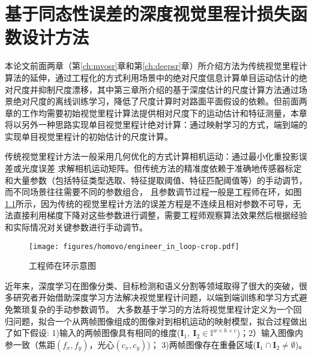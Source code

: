 \chapter{基于同态性误差的深度视觉里程计损失函数设计方法}
\label{ch:homovo}
本论文前面两章（第\ref{ch:mvosr}章和第\ref{ch:deepsr}章）所介绍方法为传统视觉里程计算法的延伸，通过工程化的方式利用场景中的绝对尺度信息计算单目运动估计的绝对尺度并抑制尺度漂移，其中第三章所介绍的基于深度估计的尺度计算方法通过场景绝对尺度的离线训练学习，降低了尺度计算时对路面平面假设的依赖。但前面两章的工作均需要初始视觉里程计算法提供相对尺度下的运动估计和特征测量，本章将以另外一种思路实现单目视觉里程计绝对计算：通过映射学习的方式，端到端的实现单目视觉里程计的初始估计的尺度计算。

传统视觉里程计方法一般采用几何优化的方式计算相机运动：通过最小化重投影误差\cite{raul2015orb}或光度误差\cite{Engel-et-al-pami2018}
求解相机运动矩阵。但传统方法的精准度依赖于准确地传感器标定和大量参数（包括特征类型选取、特征提取阈值、特征匹配阈值等）的手动调节，而不同场景往往需要不同的参数组合，
且参数调节过程一般是工程师在环，如图\ref{fig:engineer_in_loop}所示，因为传统的视觉里程计方法的误差方程是不连续且相对参数不可导，无法直接利用梯度下降对这些参数进行调整，需要工程师观察算法效果然后根据经验和实际情况对关键参数进行手动调节。

\begin{figure}[h]
    \centering
    \texttt{[image: figures/homovo/engineer\_in\_loop-crop.pdf]}
    \caption{工程师在环示意图}
    \label{fig:engineer_in_loop}
  \end{figure}

近年来，深度学习在图像分类、目标检测和语义分割等领域取得了很大的突破\cite{krizhevsky2012imagenet,girshick2015fast,long2015fully}，很多研究者开始借助深度学习方法解决视觉里程计问题，以端到端训练和学习方式避免繁琐复杂的手动参数调节。
大多数基于学习的方法将视觉里程计定义为一个回归问题，拟合一个从两帧图像组成的图像对到相机运动的映射模型，拟合过程做出了如下假设:
1)输入的两帧图像具有相同的维度($\mathbf{I}_1,\ \mathbf{I}_2 \in \mathbb{I}^{w\times h \times c}$)；2）输入图像内参一致（焦距$(f_x,f_y)$，光心$(c_x,c_y)$)；
3)两帧图像存在重叠区域($\mathbf{I}_1 \cap \mathbf{I}_2 \neq \emptyset $)。

